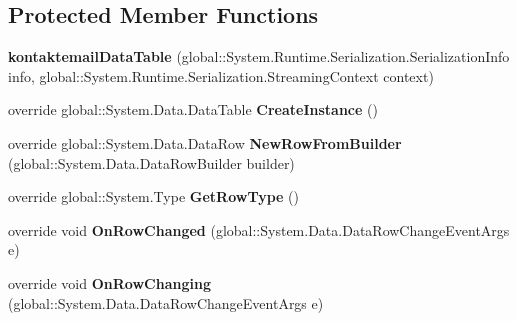 \subsection*{Protected Member Functions}
\begin{DoxyCompactItemize}
\item 
{\bfseries kontaktemail\+Data\+Table} (global\+::\+System.\+Runtime.\+Serialization.\+Serialization\+Info info, global\+::\+System.\+Runtime.\+Serialization.\+Streaming\+Context context)\hypertarget{class_products_1_1_data_1_1ds_sage_1_1kontaktemail_data_table_a898fb22dd77906c5c46f485026f687e3}{}\label{class_products_1_1_data_1_1ds_sage_1_1kontaktemail_data_table_a898fb22dd77906c5c46f485026f687e3}

\item 
override global\+::\+System.\+Data.\+Data\+Table {\bfseries Create\+Instance} ()\hypertarget{class_products_1_1_data_1_1ds_sage_1_1kontaktemail_data_table_a0ba85ecc770136f1ecb59983f1951040}{}\label{class_products_1_1_data_1_1ds_sage_1_1kontaktemail_data_table_a0ba85ecc770136f1ecb59983f1951040}

\item 
override global\+::\+System.\+Data.\+Data\+Row {\bfseries New\+Row\+From\+Builder} (global\+::\+System.\+Data.\+Data\+Row\+Builder builder)\hypertarget{class_products_1_1_data_1_1ds_sage_1_1kontaktemail_data_table_ae242916794fa6fb0cf5b45cfecff15bc}{}\label{class_products_1_1_data_1_1ds_sage_1_1kontaktemail_data_table_ae242916794fa6fb0cf5b45cfecff15bc}

\item 
override global\+::\+System.\+Type {\bfseries Get\+Row\+Type} ()\hypertarget{class_products_1_1_data_1_1ds_sage_1_1kontaktemail_data_table_a3b1674ddac8ffb3b920798191359dbda}{}\label{class_products_1_1_data_1_1ds_sage_1_1kontaktemail_data_table_a3b1674ddac8ffb3b920798191359dbda}

\item 
override void {\bfseries On\+Row\+Changed} (global\+::\+System.\+Data.\+Data\+Row\+Change\+Event\+Args e)\hypertarget{class_products_1_1_data_1_1ds_sage_1_1kontaktemail_data_table_aa7c261b81bf9b4fc834f109040396978}{}\label{class_products_1_1_data_1_1ds_sage_1_1kontaktemail_data_table_aa7c261b81bf9b4fc834f109040396978}

\item 
override void {\bfseries On\+Row\+Changing} (global\+::\+System.\+Data.\+Data\+Row\+Change\+Event\+Args e)\hypertarget{class_products_1_1_data_1_1ds_sage_1_1kontaktemail_data_table_afa033896ba4ac95b8b9046f734dc7f01}{}\label{class_products_1_1_data_1_1ds_sage_1_1kontaktemail_data_table_afa033896ba4ac95b8b9046f734dc7f01}


\end{DoxyCompactItemize}
